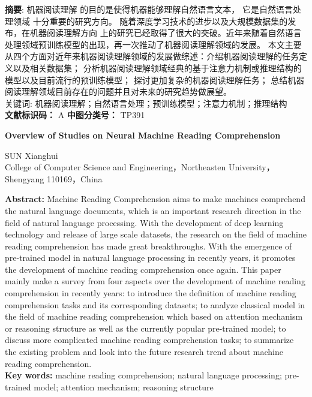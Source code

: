 \noindent \textbf{摘\quad 要}: 机器阅读理解
的目的是使得机器能够理解自然语言文本，
它是自然语言处理领域
十分重要的研究方向。
随着深度学习技术的进步以及大规模数据集的发布，在机器阅读理解方向
上的研究已经取得了很大的突破。近年来随着自然语言处理领域预训练模型的出现，再一次推动了机器阅读理解领域的发展。
本文主要从四个方面对近年来机器阅读理解领域的发展做综述：介绍机器阅读理解的任务定义以及相关数据集；
分析机器阅读理解领域经典的基于注意力机制或推理结构的模型以及目前流行的预训练模型；
探讨更加复杂的机器阅读理解任务；
总结机器阅读理解领域目前存在的问题并且对未来的研究趋势做展望。\\
\heiti 关键词: \songti 机器阅读理解；自然语言处理；预训练模型；注意力机制；推理结构　\\
\textbf{文献标识码：} A  \qquad \textbf{中图分类号：} TP391
\begin{center}
    \textbf{ Overview of Studies on Neural Machine Reading Comprehension \\}

 SUN Xianghui \\
College of Computer Science and Engineering，Northeasten University，Shengyang 110169，China

\end{center}
\textbf{Abstract:} Machine Reading Comprehension aims to make machines comprehend the natural language documents, which 
is an important research direction
 in the field of natural language processing. With the development of deep learning technology and release of large scale datasets, the research on the field of machine reading comprehension has made great breakthroughs. 
 With the emergence of pre-trained model in natural language processing in recently years, it promotes the development of machine reading comprehension once again. This paper mainly make a survey from four aspects over the development of machine reading comprehension in recently years: to introduce the definition of 
  machine reading comprehension tasks and its corresponding datasets; to analyze classical model in the field of machine reading comprehension  
  which based on attention mechanism or reasoning structure as well as the currently 
  popular pre-trained model; to discuss more complicated machine reading comprehension tasks;
   to summarize the existing problem and look into the future research trend about machine reading comprehension. \\
\textbf{Key words:} machine reading comprehension; natural language processing; pre-trained model; attention mechanism; reasoning structure











